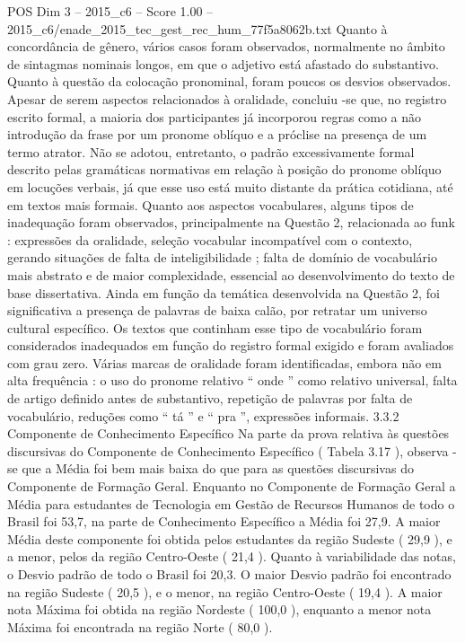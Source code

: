 \begin{textsample}{POS Dim 3 – 2015\_c6 – Score 1.00 – 2015\_c6/enade\_2015\_tec\_gest\_rec\_hum\_77f5a8062b.txt}
Quanto à concordância de gênero, vários casos foram observados, normalmente no âmbito de sintagmas nominais longos, em que o adjetivo está afastado do substantivo.
Quanto à questão da colocação pronominal, foram poucos os desvios observados.
Apesar de serem aspectos relacionados à oralidade, concluiu -se que, no registro escrito formal, a maioria dos participantes já incorporou regras como a não introdução da frase por um pronome oblíquo e a próclise na presença de um termo atrator.
Não se adotou, entretanto, o padrão excessivamente formal descrito pelas gramáticas normativas em relação à posição do pronome oblíquo em locuções verbais, já que esse uso está muito distante da prática cotidiana, até em textos mais formais.
Quanto aos aspectos vocabulares, alguns tipos de inadequação foram observados, principalmente na Questão 2, relacionada ao funk : expressões da oralidade, seleção vocabular incompatível com o contexto, gerando situações de falta de inteligibilidade ; falta de domínio de vocabulário mais abstrato e de maior complexidade, essencial ao desenvolvimento do texto de base dissertativa.
Ainda em função da temática desenvolvida na Questão 2, foi significativa a presença de palavras de baixa calão, por retratar um universo cultural específico.
Os textos que continham esse tipo de vocabulário foram considerados inadequados em função do registro formal exigido e foram avaliados com grau zero.
Várias marcas de oralidade foram identificadas, embora não em alta frequência : o uso do pronome relativo “ onde ” como relativo universal, falta de artigo definido antes de substantivo, repetição de palavras por falta de vocabulário, reduções como “ tá ” e “ pra ”, expressões informais. 3.3.2 Componente de Conhecimento Específico Na parte da prova relativa às questões discursivas do Componente de Conhecimento Específico ( Tabela 3.17 ), observa -se que a Média foi bem mais baixa do que para as questões discursivas do Componente de Formação Geral.
Enquanto no Componente de Formação Geral a Média para estudantes de Tecnologia em Gestão de Recursos Humanos de todo o Brasil foi 53,7, na parte de Conhecimento Específico a Média foi 27,9.
A maior Média deste componente foi obtida pelos estudantes da região Sudeste ( 29,9 ), e a menor, pelos da região Centro-Oeste ( 21,4 ).
Quanto à variabilidade das notas, o Desvio padrão de todo o Brasil foi 20,3.
O maior Desvio padrão foi encontrado na região Sudeste ( 20,5 ), e o menor, na região Centro-Oeste ( 19,4 ).
A maior nota Máxima foi obtida na região Nordeste ( 100,0 ), enquanto a menor nota Máxima foi encontrada na região Norte ( 80,0 ).

\end{textsample}
